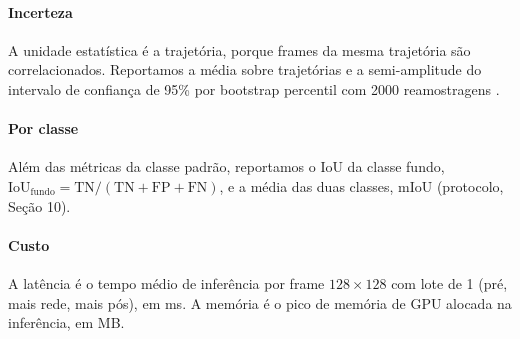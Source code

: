 \paragraph{Incerteza} A unidade estatística é a trajetória, porque frames da mesma trajetória são
correlacionados. Reportamos a média sobre trajetórias e a semi-amplitude do intervalo de confiança
de 95\% por bootstrap percentil com 2000 reamostragens \cite{efron1993}.

\paragraph{Por classe} Além das métricas da classe padrão, reportamos o IoU da classe fundo,
$\mathrm{IoU}_{\text{fundo}} = \mathrm{TN}/(\mathrm{TN}+\mathrm{FP}+\mathrm{FN})$, e a média das duas
classes, $\mathrm{mIoU}$ (protocolo, Seção 10).

\paragraph{Custo} A latência é o tempo médio de inferência por frame $128\times128$ com lote de 1
(pré, mais rede, mais pós), em ms. A memória é o pico de memória de GPU alocada na inferência, em MB.
